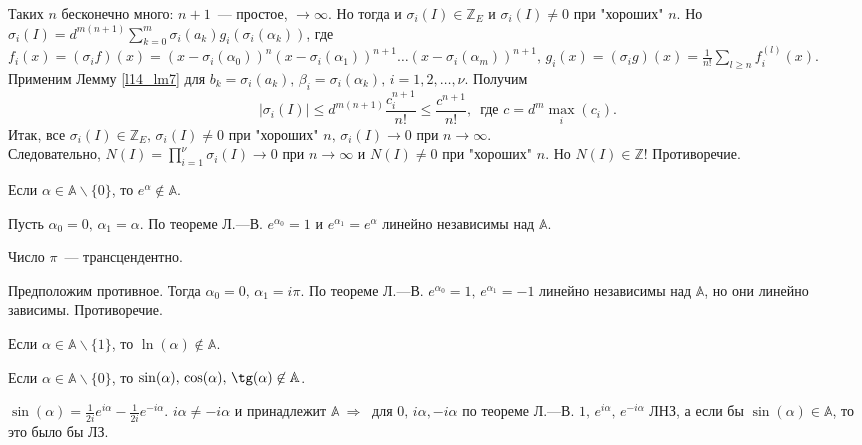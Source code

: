 \begin{pf}
	Таких $n$ бесконечно много: $n+1$ — простое, $\to \infty$. Но тогда и $\sigma_i(I) \in \mathbb{Z}_E$ и $\sigma_i(I) \ne 0$ при "хороших" $n$. Но $\displaystyle \sigma_i(I) = d^{m(n+1)} \sum\limits_{k=0}^m \sigma_i(a_k)g_i(\sigma_i(\alpha_k))$, где $f_i(x) = (\sigma_if)(x) = (x-\sigma_i(\alpha_0))^n(x-\sigma_i(\alpha_1))^{n+1}\dots(x-\sigma_i(\alpha_m))^{n+1}, \, g_i(x) = (\sigma_ig)(x) = \frac{1}{n!} \sum\limits_{l \geq n} f_i^{(l)}(x)$.
	Применим Лемму \ref{l14_lm7} для $b_k = \sigma_i(a_k), \, \beta_i = \sigma_i(\alpha_k), \, i=1,2,\dots,\nu$. Получим
	$$\left| \sigma_i(I) \right| \leq d^{m(n+1)}\frac{c_i^{n+1}}{n!} \leq \frac{c^{n+1}}{n!}, \, \text{ где } c=d^m\max\limits_i(c_i).$$
	Итак, все $\sigma_i(I) \in \mathbb{Z}_E, \, \sigma_i(I) \ne 0$ при "хороших" $n, \, \sigma_i(I) \to 0$ при $n \to \infty$.\\
	Следовательно, $\displaystyle N(I) = \prod\limits_{i=1}^\nu \sigma_i(I) \to 0$ при $n \to \infty$ и $N(I) \ne 0$ при "хороших" $n$. Но $N(I) \in \mathbb{Z}$!
	Противоречие.
\end{pf}

\begin{corollary}[из теоремы Л.—В.] \label{l14_cor1}
	Если $\alpha \in \mathbb{A} \backslash \{ 0 \}$, то $e^\alpha \not\in \mathbb{A}$.
\end{corollary}
\begin{pf}
	Пусть $\alpha_0 =0, \, \alpha_1=\alpha$. По теореме Л.—В. $e^{\alpha_0}=1$ и $e^{\alpha_1}=e^\alpha$ линейно независимы над $\mathbb{A}$.
\end{pf}

\begin{corollary} \label{l14_cor2}
	Число $\pi$ — трансцендентно.
\end{corollary}
\begin{pf}
	Предположим противное. Тогда $\alpha_0 = 0, \, \alpha_1 = i\pi$. По теореме Л.—В.
	$e^{\alpha_0} = 1, \, e^{\alpha_1} = -1$ линейно независимы над $\mathbb{A}$, но они линейно зависимы.
	Противоречие.
\end{pf}

\begin{corollary} \label{l14_cor3}
	Если $\alpha \in \mathbb{A} \backslash \{ 1 \}$, то $\ln(\alpha) \not\in \mathbb{A}$.
\end{corollary}

\begin{corollary} \label{l14_cor4}
	Если $\alpha \in \mathbb{A} \backslash \{ 0 \}$, то $\sin(\alpha),\,\cos(\alpha),\,\tg(\alpha) \not\in \mathbb{A}$.
\end{corollary}
\begin{pf}
	$\sin(\alpha) = \frac{1}{2i}e^{i\alpha}-\frac{1}{2i}e^{-i\alpha}$. $i\alpha \ne -i\alpha$ и принадлежит $\mathbb{A} \ \Rightarrow \ $ для $0,\,i\alpha,-i\alpha$ по теореме Л.—В.
	$1,\,e^{i\alpha},\,e^{-i\alpha}$ ЛНЗ, а если бы $\sin(\alpha) \in \mathbb{A}$, то это было бы ЛЗ.
\end{pf}

